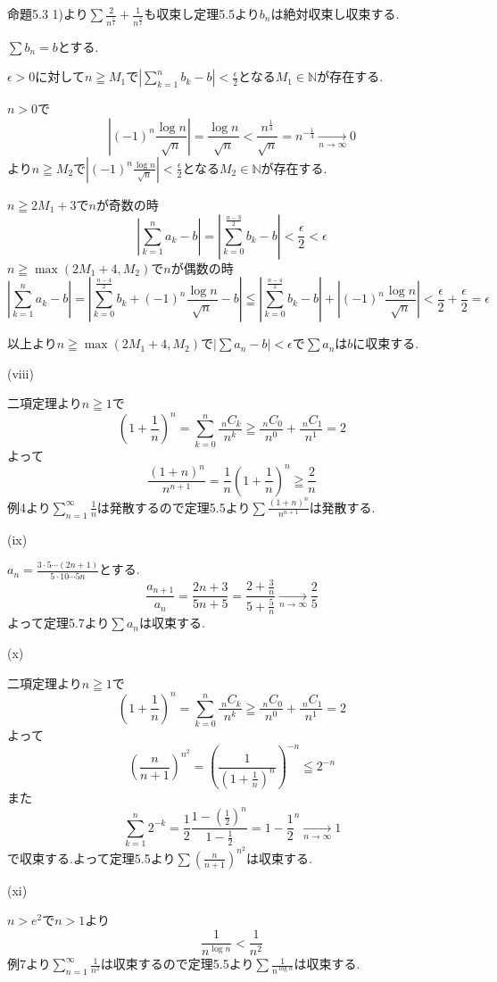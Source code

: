 \documentclass{jsarticle}
\begin{document}
命題5.3 1)より$\sum \frac{2}{n^\frac{5}{4}}+\frac{1}{n^\frac{3}{2}}$も収束し定理5.5より$b_n$は絶対収束し収束する.

$\sum b_n = b$とする.

$\epsilon > 0$に対して$n\geqq M_1$で$\displaystyle|\sum_{k=1}^nb_k-b|<\frac{\epsilon}{2}$となる$M_1\in\mathbb{N}$が存在する.

$n>0$で
\[|(-1)^n\frac{\log n}{\sqrt{n}}| = \frac{\log n}{\sqrt{n}} < \frac{n^{\frac{1}{4}}}{\sqrt{n}}=n^{-\frac{1}{4}}\xrightarrow[n\to \infty]{}0\]
より$n\geqq M_2$で$|(-1)^n\frac{\log n}{\sqrt{n}}|<\frac{\epsilon}{2}$となる$M_2\in\mathbb{N}$が存在する.

$n\geqq 2M_1+3$で$n$が奇数の時
\[|\sum_{k=1}^na_k - b|=|\sum_{k=0}^{\frac{n-3}{2}}b_k - b| < \frac{\epsilon}{2}<\epsilon\]
$n\geqq \max(2M_1+4,M_2)$で$n$が偶数の時
\[|\sum_{k=1}^na_k - b|=|\sum_{k=0}^{\frac{n-4}{2}}b_k + (-1)^n\frac{\log n}{\sqrt{n}}- b| \leqq |\sum_{k=0}^{\frac{n-4}{2}}b_k- b|+|(-1)^n\frac{\log n}{\sqrt{n}}| <\frac{\epsilon}{2}+\frac{\epsilon}{2} = \epsilon\]

以上より$n \geqq \max(2M_1+4,M_2)$で$|\sum a_n - b|<\epsilon$で$\sum a_n$は$b$に収束する.

(viii)

二項定理より$n \geqq 1$で
\[(1+\frac{1}{n})^n =\sum_{k=0}^n\frac{\ _nC_k}{n^k} \geqq \frac{\ _nC_0}{n^0}+\frac{\ _nC_1}{n^1} = 2\]
よって
\[\frac{(1+n)^n}{n^{n+1}} = \frac{1}{n}(1+\frac{1}{n})^n \geqq \frac{2}{n}\]
例4より$\displaystyle \sum_{n=1}^\infty \frac{1}{n}$は発散するので定理5.5より$\sum \frac{(1+n)^n}{n^{n+1}}$は発散する.

(ix)

$a_n=\frac{3\cdot 5\cdots (2n+1)}{5\cdot 10\cdots 5n}$とする.
\[\frac{a_{n+1}}{a_n}=\frac{2n+3}{5n+5}=\frac{2+\frac{3}{n}}{5+\frac{5}{n}}\xrightarrow[n\to\infty]{}\frac{2}{5}\]
よって定理5.7より$\sum a_n$は収束する.

(x)

二項定理より$n \geqq 1$で
\[(1+\frac{1}{n})^n =\sum_{k=0}^n\frac{\ _nC_k}{n^k} \geqq \frac{\ _nC_0}{n^0}+\frac{\ _nC_1}{n^1} = 2\]
よって
\[(\frac{n}{n+1})^{n^2}=(\frac{1}{(1+\frac{1}{n})^n})^{-n}\leqq 2^{-n}\]
また
\[\sum_{k=1}^n 2^{-k}=\frac{1}{2}\frac{1-(\frac{1}{2})^n}{1-\frac{1}{2}} =1-\frac{1}{2}^{n}\xrightarrow[n\to\infty]{}1\]
で収束する.よって定理5.5より$\sum (\frac{n}{n+1})^{n^2}$は収束する.

(xi)

$n>e^2$で$n>1$より
\[\frac{1}{n^{\log n}} < \frac{1}{n^2}\]
例7より$\displaystyle \sum_{n=1}^\infty \frac{1}{n^2}$は収束するので定理5.5より$\sum \frac{1}{n^{\log n}}$は収束する.
\end{document}
